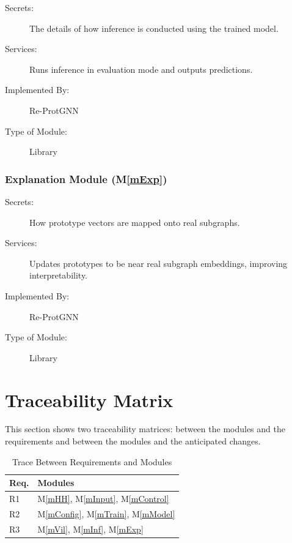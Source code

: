 \documentclass[12pt, titlepage]{article}
\newcommand{\mref}[1]{M\ref{#1}}
\begin{document}
\begin{description}
\item[Secrets:] The details of how inference is conducted using the trained model.

\item[Services:] Runs inference in evaluation mode and outputs predictions.

\item[Implemented By:] Re-ProtGNN
\item[Type of Module:] Library
\end{description}


\subsubsection{Explanation Module
 (\mref{mExp})}

\begin{description}
\item[Secrets:] How prototype vectors are mapped onto real subgraphs.

\item[Services:] Updates prototypes to be near real subgraph embeddings, improving interpretability.

\item[Implemented By:] Re-ProtGNN
\item[Type of Module:] Library
\end{description}





\section{Traceability Matrix} \label{SecTM}

This section shows two traceability matrices: between the modules and the
requirements and between the modules and the anticipated changes.

\begin{table}[H]
\centering
\begin{tabular}{p{} p{}}
\toprule
\textbf{Req.} & \textbf{Modules}\\
\midrule
R1 & \mref{mHH}, \mref{mInput}, \mref{mControl}\\
R2 & \mref{mConfig}, \mref{mTrain}, \mref{mModel}\\
R3 & \mref{mVil}, \mref{mInf}, \mref{mExp} \\
\bottomrule
\end{tabular}
\caption{Trace Between Requirements and Modules}
\label{TblRT}
\end{table}
\end{document}
